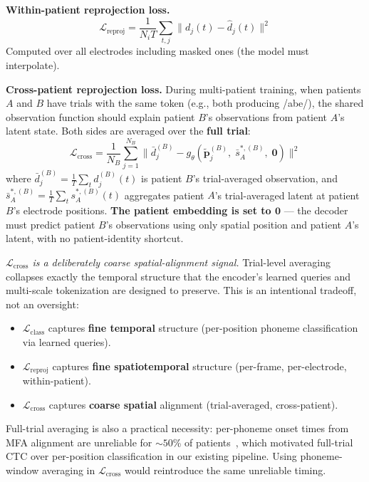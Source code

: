 \documentclass[11pt,letterpaper]{article}
\newcommand{\bfp}{\mathbf{p}}
\begin{document}
\textbf{Within-patient reprojection loss.}
\begin{equation}
\mathcal{L}_{\text{reproj}} = \frac{1}{N_i T} \sum_{t,j} \bigl\| d_j(t) - \hat{d}_j(t) \bigr\|^2
\end{equation}
Computed over all electrodes including masked ones (the model must interpolate).

\textbf{Cross-patient reprojection loss.}\label{sec:cross-reproj}
During multi-patient training, when patients $A$ and $B$ have trials with the same token (e.g., both producing /abe/), the shared observation function should explain patient $B$'s observations from patient $A$'s latent state. Both sides are averaged over the \textbf{full trial}:
\begin{equation}
\mathcal{L}_{\text{cross}} = \frac{1}{N_B} \sum_{j=1}^{N_B} \bigl\| \bar{d}_j^{(B)} - g_\theta(\tilde{\bfp}_j^{(B)},\; \bar{s}_A^{*,(B)},\; \mathbf{0}) \bigr\|^2
\end{equation}
where $\bar{d}_j^{(B)} = \tfrac{1}{T}\sum_{t} d_j^{(B)}(t)$ is patient $B$'s trial-averaged observation, and $\bar{s}_A^{*,(B)} = \tfrac{1}{T}\sum_{t} s_A^{*,(B)}(t)$ aggregates patient $A$'s trial-averaged latent at patient $B$'s electrode positions. \textbf{The patient embedding is set to $\mathbf{0}$} --- the decoder must predict patient $B$'s observations using only spatial position and patient $A$'s latent, with no patient-identity shortcut.

\textcolor{BrickRed}{\textit{$\mathcal{L}_{\text{cross}}$ is a deliberately coarse spatial-alignment signal.}} Trial-level averaging collapses exactly the temporal structure that the encoder's learned queries and multi-scale tokenization are designed to preserve. This is an intentional tradeoff, not an oversight:
\begin{itemize}[leftmargin=2em]
\item $\mathcal{L}_{\text{class}}$ captures \textbf{fine temporal} structure (per-position phoneme classification via learned queries).
\item $\mathcal{L}_{\text{reproj}}$ captures \textbf{fine spatiotemporal} structure (per-frame, per-electrode, within-patient).
\item $\mathcal{L}_{\text{cross}}$ captures \textbf{coarse spatial} alignment (trial-averaged, cross-patient).
\end{itemize}
Full-trial averaging is also a practical necessity: per-phoneme onset times from MFA alignment are unreliable for ${\sim}50$\% of patients~\cite{spalding2025}, which motivated full-trial CTC over per-position classification in our existing pipeline. Using phoneme-window averaging in $\mathcal{L}_{\text{cross}}$ would reintroduce the same unreliable timing.
\end{document}
